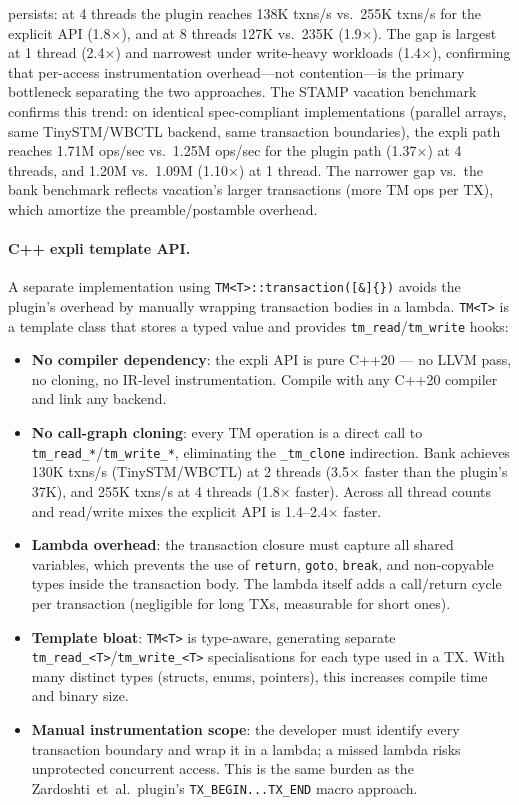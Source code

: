 \documentclass[article,12pt]{article}
\newcommand{\ZardoshtiEtAl}{Zardoshti~et~al.}
\begin{document}
persists: at 4 threads the plugin reaches 138K txns/s vs.\ 255K txns/s
for the explicit API (1.8$\times$), and at 8 threads 127K vs.\ 235K
(1.9$\times$).  The gap is largest at 1 thread (2.4$\times$) and
narrowest under write-heavy workloads (1.4$\times$), confirming that
per-access instrumentation overhead---not contention---is the primary
bottleneck separating the two approaches.  The STAMP vacation benchmark
confirms this trend: on identical spec-compliant implementations
(parallel arrays, same TinySTM/WBCTL backend, same transaction
boundaries), the expli path reaches 1.71M ops/sec vs.\ 1.25M ops/sec
for the plugin path (1.37$\times$) at 4 threads, and 1.20M vs.\ 1.09M
(1.10$\times$) at 1 thread.  The narrower gap vs.\ the bank benchmark
reflects vacation's larger transactions (more TM ops per TX), which
amortize the preamble/postamble overhead.

\paragraph{C++ expli template API.}
A separate implementation using \texttt{TM<T>::transaction([\&]\{\})} avoids
the plugin's overhead by manually wrapping transaction bodies in a lambda.
\texttt{TM<T>} is a template class that stores a typed value and provides
\texttt{tm\_read}/\texttt{tm\_write} hooks:
\begin{itemize}
\item \textbf{No compiler dependency}: the expli API is pure C++20 --- no
  LLVM pass, no cloning, no IR-level instrumentation.  Compile with any
  C++20 compiler and link any backend.
\item \textbf{No call-graph cloning}: every TM operation is a direct call
  to \texttt{tm\_read\_*}/\texttt{tm\_write\_*}, eliminating the
  \texttt{\_tm\_clone} indirection.  Bank achieves 130K txns/s (TinySTM/WBCTL)
  at 2 threads (3.5$\times$ faster than the plugin's 37K), and 255K txns/s
  at 4 threads (1.8$\times$ faster).  Across all thread counts and read/write
  mixes the explicit API is 1.4--2.4$\times$ faster.
\item \textbf{Lambda overhead}: the transaction closure must capture all
  shared variables, which prevents the use of \texttt{return},
  \texttt{goto}, \texttt{break}, and non-copyable types inside the
  transaction body.  The lambda itself adds a call/return cycle per
  transaction (negligible for long TXs, measurable for short ones).
\item \textbf{Template bloat}: \texttt{TM<T>} is type-aware, generating
  separate \texttt{tm\_read\_<T>}/\texttt{tm\_write\_<T>} specialisations
  for each type used in a TX.  With many distinct types (structs, enums,
  pointers), this increases compile time and binary size.
\item \textbf{Manual instrumentation scope}: the developer must identify
  every transaction boundary and wrap it in a lambda; a missed lambda risks
  unprotected concurrent access.  This is the same burden as the
  \ZardoshtiEtAl\ plugin's \texttt{TX\_BEGIN...TX\_END} macro approach.
\end{itemize}
\end{document}
